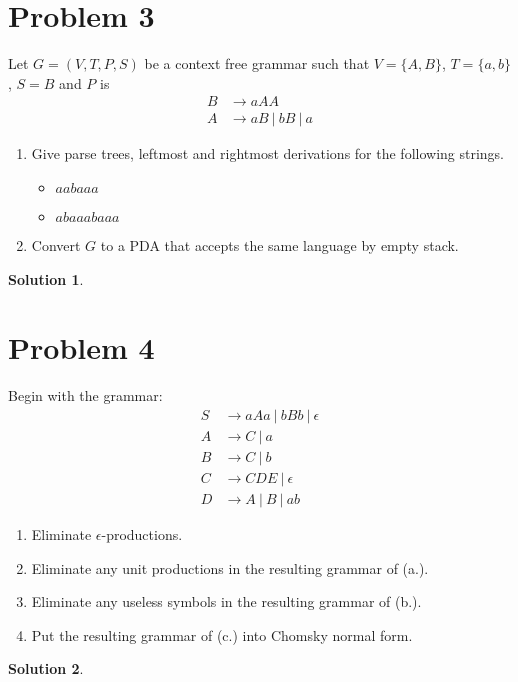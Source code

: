\documentclass[a4paper,UTF8]{article}
\theoremstyle{definition}
\newtheorem*{solution}{Solution}
\begin{document}
\section*{Problem 3}
Let $G = (V, T, P, S)$ be a context free grammar such that $V = \{A, B\}$, $T = \{a, b\}$, $S = B$ and $P$ is
\[
\begin{aligned}
  B &\rightarrow aAA \\
  A &\rightarrow aB \ |\ bB\ |\ a
\end{aligned}
\]
\begin{enumerate}
  \item[a.] Give parse trees, leftmost and rightmost derivations for the following strings.
  \begin{itemize}
    \item[1.] $aabaaa$
    \item[2.] $abaaabaaa$
  \end{itemize}
  \item[b.] Convert $G$ to a PDA that accepts the same language by empty stack.
\end{enumerate}
\begin{solution}
\end{solution}
\newpage

\section*{Problem 4}
Begin with the grammar:
\[
  \begin{aligned}
    S &\rightarrow aAa\ |\ bBb\ |\ \epsilon \\
    A &\rightarrow C \ |\ a \\
    B &\rightarrow C \ |\ b \\
    C &\rightarrow CDE\ |\ \epsilon\\
    D &\rightarrow A\ |\ B\ |\ ab
  \end{aligned}
\]
\begin{enumerate}
  \item[a.] Eliminate $\epsilon$-productions.
  \item[b.] Eliminate any unit productions in the resulting grammar of (a.).
  \item[c.] Eliminate any useless symbols in the resulting grammar of (b.).
  \item[d.] Put the resulting grammar of (c.) into Chomsky normal form.
\end{enumerate}
\begin{solution}
\end{solution}
\newpage
\end{document}
